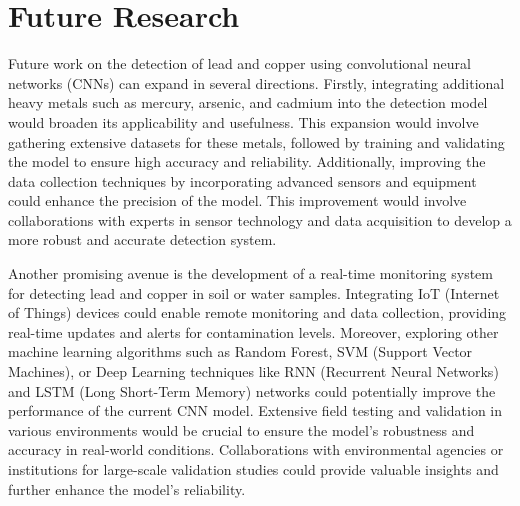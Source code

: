 \chapter{Future Research}
\label{ch:Fr}
Future work on the detection of lead and copper using convolutional neural networks (CNNs) can expand in several directions. Firstly, integrating additional heavy metals such as mercury, arsenic, and cadmium into the detection model would broaden its applicability and usefulness. This expansion would involve gathering extensive datasets for these metals, followed by training and validating the model to ensure high accuracy and reliability. Additionally, improving the data collection techniques by incorporating advanced sensors and equipment could enhance the precision of the model. This improvement would involve collaborations with experts in sensor technology and data acquisition to develop a more robust and accurate detection system.

Another promising avenue is the development of a real-time monitoring system for detecting lead and copper in soil or water samples. Integrating IoT (Internet of Things) devices could enable remote monitoring and data collection, providing real-time updates and alerts for contamination levels. Moreover, exploring other machine learning algorithms such as Random Forest, SVM (Support Vector Machines), or Deep Learning techniques like RNN (Recurrent Neural Networks) and LSTM (Long Short-Term Memory) networks could potentially improve the performance of the current CNN model. Extensive field testing and validation in various environments would be crucial to ensure the model's robustness and accuracy in real-world conditions. Collaborations with environmental agencies or institutions for large-scale validation studies could provide valuable insights and further enhance the model's reliability.


% 				
% 






